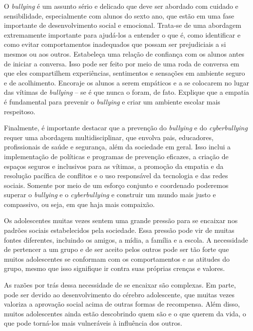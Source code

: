 O {\em bullying} é um assunto sério e delicado que deve ser abordado com
cuidado e sensibilidade, especialmente com alunos do sexto ano, que
estão em uma fase importante de desenvolvimento social e emocional.
Trata-se de uma abordagem extremamente importante para ajudá-los a
entender o que é, como identificar e como evitar comportamentos
inadequados que possam ser prejudiciais a si mesmos ou aos outros.
Estabeleça uma relação de confiança com os alunos antes de iniciar a
conversa. Isso pode ser feito por meio de uma roda de conversa em que
eles compartilhem experiências, sentimentos e sensações em ambiente
seguro e de acolhimento. Encoraje os alunos a serem empáticos e a se
colocarem no lugar das vítimas de {\em bullying} -- se é que nunca o
foram, de fato. Explique que a empatia é fundamental para prevenir o
{\em bullying} e criar um ambiente escolar mais respeitoso.

Finalmente, é importante destacar que a prevenção do {\em bullying} e do
{\em cyberbullying} requer uma abordagem multidisciplinar, que envolva
pais, educadores, profissionais de saúde e segurança, além da sociedade
em geral. Isso inclui a implementação de políticas e programas de
prevenção eficazes, a criação de espaços seguros e inclusivos para as
vítimas, a promoção da empatia e da resolução pacífica de conflitos e o
uso responsável da tecnologia e das redes sociais. Somente por meio de
um esforço conjunto e coordenado poderemos superar o {\em bullying} e o
{\em cyberbullying} e construir um mundo mais justo e compassivo, ou
seja, em que haja mais compaixão.

\startPAPEL
\color[darkred]{\bfb Papel e caneta}


Os adolescentes muitas vezes sentem uma grande pressão para se encaixar
nos padrões sociais estabelecidos pela sociedade. Essa pressão pode vir
de muitas fontes diferentes, incluindo os amigos, a mídia, a família e a
escola. A necessidade de pertencer a um grupo e de ser aceito pelos
outros pode ser tão forte que muitos adolescentes se conformam com os
comportamentos e as atitudes do grupo, mesmo que isso signifique ir
contra suas próprias crenças e valores.

As razões por trás dessa necessidade de se encaixar são complexas. Em
parte, pode ser devido ao desenvolvimento do cérebro adolescente, que
muitas vezes valoriza a aprovação social acima de outras formas de
recompensa. Além disso, muitos adolescentes ainda estão descobrindo quem
são e o que querem da vida, o que pode torná-los mais vulneráveis à
influência dos outros.

